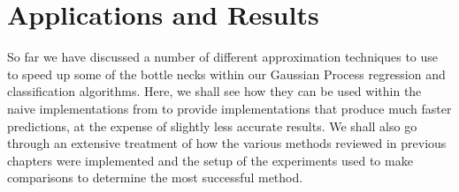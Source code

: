 \section{Applications and Results}\label{Chapter5}

So far we have discussed a number of different approximation techniques to use to speed up some of the bottle necks within our Gaussian Process regression and classification algorithms. Here, we shall see how they can be used within the naive implementations from  to provide implementations that produce much faster predictions, at the expense of slightly less accurate results. We shall also go through an extensive treatment of how the various methods reviewed in previous chapters were implemented and the setup of the experiments used to make comparisons to determine the most successful method.





